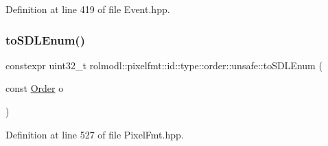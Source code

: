 Definition at line 419 of file Event.\+hpp.

\mbox{\label{namespacerolmodl_1_1pixelfmt_1_1id_1_1type_1_1order_1_1unsafe_a024d2e14288cf53b70e892eb4250a02c}} 
\subsubsection{\texorpdfstring{toSDLEnum()}{toSDLEnum()}}
{\footnotesize\ttfamily constexpr uint32\+\_\+t rolmodl\+::pixelfmt\+::id\+::type\+::order\+::unsafe\+::to\+S\+D\+L\+Enum (\begin{DoxyParamCaption}\item[{const \mbox{\hyperlink{namespacerolmodl_1_1pixelfmt_1_1id_1_1type_a01a03db37a556bc98643bd88b2f5b6b3}{Order}}}]{o }\end{DoxyParamCaption})\hspace{0.3cm}{\ttfamily [noexcept]}}



Definition at line 527 of file Pixel\+Fmt.\+hpp.

